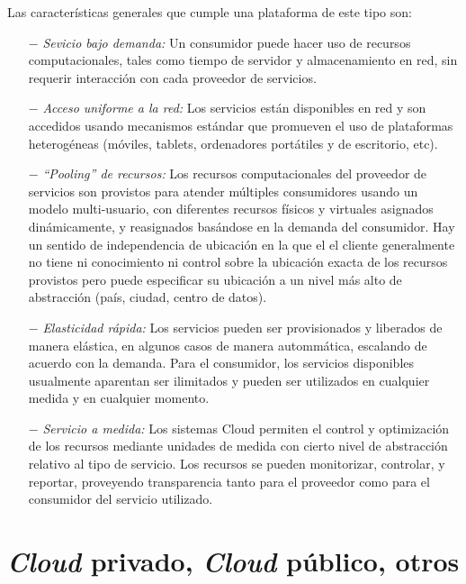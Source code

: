 Las caracter\'isticas generales que cumple una plataforma de este tipo son:

\begin{itemize}

\item[$-$] \textit{Sevicio bajo demanda: }Un consumidor puede hacer uso de recursos computacionales, tales como tiempo de servidor y almacenamiento en red, sin requerir interacci\'on con cada proveedor de servicios.

\item[$-$] \textit{Acceso uniforme a la red: }Los servicios est\'an disponibles en red y son accedidos usando mecanismos est\'andar que promueven el uso de plataformas heterog\'eneas (m\'oviles, tablets, ordenadores port\'atiles y de escritorio, etc).

\item[$-$] \textit{``Pooling'' de recursos: }Los recursos computacionales del proveedor de servicios son provistos para atender m\'ultiples consumidores usando un modelo multi-usuario, con diferentes recursos f\'isicos y virtuales asignados din\'amicamente, y reasignados bas\'andose en la demanda del consumidor. Hay un sentido de independencia de ubicaci\'on en la que el el cliente generalmente no tiene ni conocimiento ni control sobre la ubicaci\'on exacta de los recursos provistos pero puede especificar su ubicaci\'on a un nivel m\'as alto de abstracci\'on (pa\'is, ciudad, centro de datos).

\item[$-$] \textit{Elasticidad r\'apida: }Los servicios pueden ser provisionados y liberados de manera el\'astica, en algunos casos de manera automm\'atica, escalando de acuerdo con la demanda. Para el consumidor, los servicios disponibles usualmente aparentan ser ilimitados y pueden ser utilizados en cualquier medida y en cualquier momento.

\item[$-$] \textit{Servicio a medida: }Los sistemas Cloud permiten el control y optimizaci\'on de los recursos mediante unidades de medida con cierto nivel de abstracci\'on relativo al tipo de servicio. Los recursos se pueden monitorizar, controlar, y reportar, proveyendo transparencia tanto para el proveedor como para el consumidor del servicio utilizado.

\end{itemize}

\section{\textit{Cloud} privado, \textit{Cloud} p\'ublico, otros}

